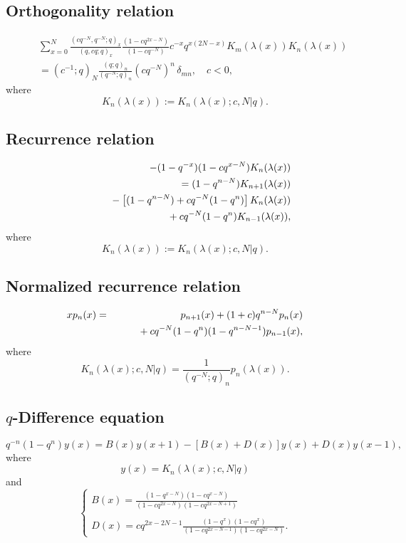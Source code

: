 \documentclass[envcountchap,graybox]{svmono}
\newcommand{\mathindent}{\hspace{7.5mm}}
\begin{document}
{\subsection*{Orthogonality relation}
\begin{eqnarray}
\label{OrtDualqKrawtchouk}
& &\sum_{x=0}^N\frac{(cq^{-N},q^{-N};q)_x}{(q,cq;q)_x}
\frac{(1-cq^{2x-N})}{(1-cq^{-N})}c^{-x}q^{x(2N-x)}K_m(\lambda(x))K_n(\lambda(x))\nonumber\\
& &{}=(c^{-1};q)_N\frac{(q;q)_n}{(q^{-N};q)_n}(cq^{-N})^n\,\delta_{mn},\quad c<0,
\end{eqnarray}
where
$$K_n(\lambda(x)):=K_n(\lambda(x);c,N|q).$$

\newpage

\subsection*{Recurrence relation}
\begin{eqnarray}
\label{RecDualqKrawtchouk}
& &-(1-q^{-x})(1-cq^{x-N})K_n(\lambda(x))\nonumber\\
& &{}=(1-q^{n-N})K_{n+1}(\lambda(x))\nonumber\\
& &{}\mathindent{}-\left[(1-q^{n-N})+cq^{-N}(1-q^n)\right]K_n(\lambda(x))\nonumber\\
& &{}\mathindent\mathindent{}+cq^{-N}(1-q^n)K_{n-1}(\lambda(x)),
\end{eqnarray}
where
$$K_n(\lambda(x)):=K_n(\lambda(x);c,N|q).$$

\subsection*{Normalized recurrence relation}
\begin{eqnarray}
\label{NormRecDualqKrawtchouk}
xp_n(x)&=&p_{n+1}(x)+(1+c)q^{n-N}p_n(x)\nonumber\\
& &{}\mathindent{}+cq^{-N}(1-q^n)(1-q^{n-N-1})p_{n-1}(x),
\end{eqnarray}
where
$$K_n(\lambda(x);c,N|q)=\frac{1}{(q^{-N};q)_n}p_n(\lambda(x)).$$

\subsection*{$q$-Difference equation}
\begin{equation}
\label{dvDualqKrawtchouk}
q^{-n}(1-q^n)y(x)=B(x)y(x+1)-\left[B(x)+D(x)\right]y(x)+D(x)y(x-1),
\end{equation}
where
$$y(x)=K_n(\lambda(x);c,N|q)$$
and
$$\left\{\begin{array}{l}\displaystyle B(x)=\frac{(1-q^{x-N})(1-cq^{x-N})}{(1-cq^{2x-N})(1-cq^{2x-N+1})}\\
\\
\displaystyle D(x)=cq^{2x-2N-1}\frac{(1-q^x)(1-cq^x)}{(1-cq^{2x-N-1})(1-cq^{2x-N})}.\end{array}\right.$$

}
\end{document}
